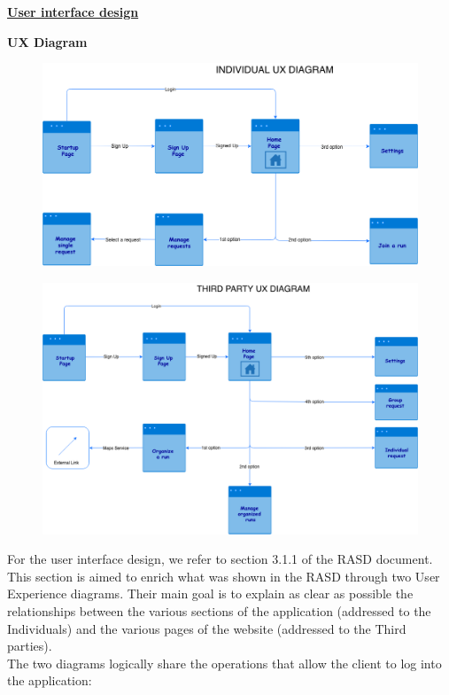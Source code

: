 	\underline{\textbf{User interface design}}
	\begin{legal}
	\item \textbf{UX Diagram}
	\begin{figure}[H]
		\includegraphics[width=\linewidth]{../images/design/IndividualUX.png}
	\end{figure}
	\begin{figure}[H]
		\includegraphics[width=\linewidth]{../images/design/ThirdPartyUX.png}
	\end{figure}
	\end{legal}
For the user interface design, we refer to section 3.1.1 of the RASD document. This section is aimed to enrich what was shown in the RASD through two User Experience diagrams. Their main goal is to explain as clear as possible the relationships between the various sections of the application (addressed to the Individuals) and the various pages of the website (addressed to the Third parties).\\
The two diagrams logically share the operations that allow the client to log into the application: 
